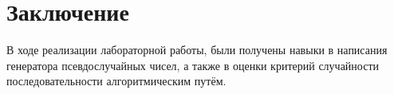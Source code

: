 \section{Заключение}

В ходе реализации лабораторной работы, были получены навыки в написания генератора псевдослучайных чисел, а также в оценки критерий случайности последовательности алгоритмическим путём.